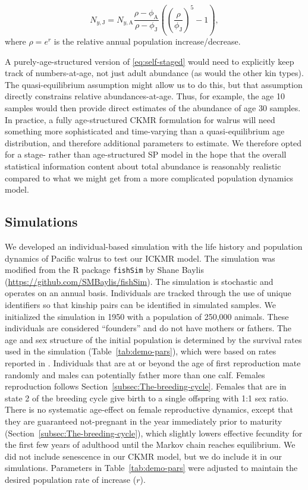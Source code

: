 \[
N_{y,\text{J}}=N_{y,\text{A}}\frac{\rho-\phi_{\text{A}}}{\rho-\phi_{\text{J}}}\left(\left(\frac{\rho}{\phi_{\text{J}}}\right)^{5}-1\right),
\]
where $\rho=e^{r}$ is the relative annual population increase/decrease.

A purely-age-structured version of \eqref{eq:self-staged} would need
to explicitly keep track of numbers-at-age, not just adult abundance
(as would the other kin types). The quasi-equilibrium assumption might
allow us to do this, but that assumption directly constrains relative
abundances-at-age. Thus, for example, the age 10 samples would then
provide direct estimates of the abundance of age 30 samples. In practice,
a fully age-structured CKMR formulation for walrus will need something
more sophisticated and time-varying than a quasi-equilibrium age distribution,
and therefore additional parameters to estimate. We therefore opted
for a stage- rather than age-structured SP model in the hope that
the overall statistical information content about total abundance
is reasonably realistic compared to what we might get from a more
complicated population dynamics model.

\subsection{Simulations}

We developed an individual-based simulation with the life history
and population dynamics of Pacific walrus to test our ICKMR model.
The simulation was modified from the R package \texttt{fishSim} by
Shane Baylis (\url{https://github.com/SMBaylis/fishSim}). The simulation
is stochastic and operates on an annual basis. Individuals are tracked
through the use of unique identifiers so that kinship pairs can be
identified in simulated samples. We initialized the simulation in
1950 with a population of 250,000 animals. These individuals are considered
``founders'' and do not have mothers or fathers. The age and sex
structure of the initial population is determined by the survival
rates used in the simulation (Table~\ref{tab:demo-pars}), which
were based on rates reported in \citet{taylor_demography_2018}. Individuals
that are at or beyond the age of first reproduction mate randomly
and males can potentially father more than one calf. Females reproduction
follows Section~\ref{subsec:The-breeding-cycle}. Females that are
in state 2 of the breeding cycle give birth to a single offspring
with 1:1 sex ratio. There is no systematic age-effect on female reproductive
dynamics, except that they are guaranteed not-pregnant in the year
immediately prior to maturity (Section~\ref{subsec:The-breeding-cycle}),
which slightly lowers effective fecundity for the first few years
of adulthood until the Markov chain reaches equilibrium. We did not
include senescence in our CKMR model, but we do include it in our
simulations. Parameters in Table~\ref{tab:demo-pars} were adjusted
to maintain the desired population rate of increase ($r$).

